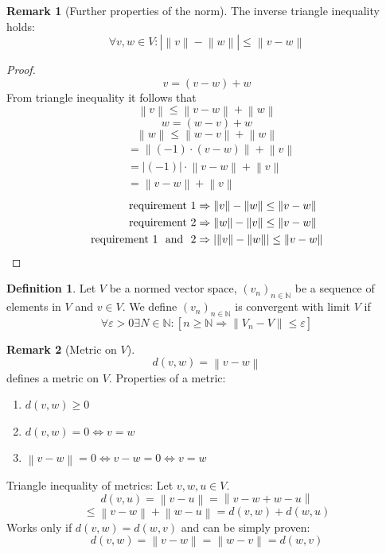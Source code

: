 \documentclass[a4paper,landscape,twocolumn]{article}
\theoremstyle{definition}
\newtheorem{defi}{Definition}
\newtheorem{rem}{Remark}
\newcommand\abs[1]{\left|#1\right|}
\newcommand\norm[1]{\left\|#1\right\|}
\begin{document}
\begin{rem}[Further properties of the norm]
  The inverse triangle inequality holds:
  \[ \forall v,w \in V: \abs{\norm{v} - \norm{w}} \leq \norm{v - w} \]
\end{rem}
\begin{proof}
  \[ v = (v - w) + w \]
  From triangle inequality it follows that
  \[ \norm{v} \leq \norm{v - w} + \norm{w} \]
  \[ w = (w - v) + w \]
  \[ \norm{w} \leq \norm{w - v} + \norm{w} \]
  \begin{align*}
    &= \norm{(-1) \cdot (v - w)} + \norm{v} \\
    &= \abs{(-1)} \cdot \norm{v - w} + \norm{v} \\
    &= \norm{v - w} + \norm{v}
  \end{align*}
  \begin{align*}
    \text{requirement 1} &\Rightarrow \norm{v} - \norm{w} \leq \norm{v - w} \\
    \text{requirement 2} &\Rightarrow \norm{w} - \norm{v} \leq \norm{v - w} \\
    \text{requirement 1 \text{ and } 2} &\Rightarrow \abs{\norm{v} - \norm{w}} \leq \norm{v - w}
  \end{align*}
\end{proof}

\begin{defi}
  Let $V$ be a normed vector space, $(v_n)_{n\in\mathbb N}$ be a sequence of
  elements in $V$ and $v \in V$. We define $(v_n)_{n\in\mathbb N}$ is convergent
  with limit $V$ if
  \[
    \forall \varepsilon > 0 \exists N \in \mathbb N:
    \left[n \geq \mathbb N \Rightarrow \norm{V_n - V} \leq \varepsilon\right]
  \]
\end{defi}
\begin{rem}[Metric on $V$]
  \[ d(v, w) = \norm{v - w} \]
  defines a metric on $V$.
  Properties of a metric:
  \begin{enumerate}
    \item $d(v,w) \geq 0$
    \item $d(v,w) = 0 \Leftrightarrow v = w$
    \item $\norm{v - w} = 0 \Leftrightarrow v - w = 0 \Leftrightarrow v = w$
  \end{enumerate}
  Triangle inequality of metrics:
  Let $v,w,u \in V$.
  \[ d(v,u) = \norm{v - u} = \norm{v - w + w - u} \]
  \[ \leq \norm{v - w} + \norm{w - u} = d(v,w) + d(w,u) \]
  Works only if $d(v,w) = d(w,v)$ and can be simply proven:
  \[ d(v,w) = \norm{v-w} = \norm{w - v} = d(w,v) \]
\end{rem}
\end{document}

